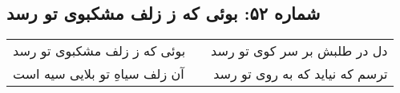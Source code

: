 \begin{center}
\section*{شماره ۵۲: بوئی که ز زلف مشکبوی تو رسد}
\label{sec:052}
\begin{longtable}{l p{0.5cm} r}
بوئی که ز زلف مشکبوی تو رسد
&&
دل در طلبش بر سر کوی تو رسد
\\
آن زلف سیاهِ تو بلایی سیه است
&&
ترسم که نیاید که به روی تو رسد
\\
\end{longtable}
\end{center}
